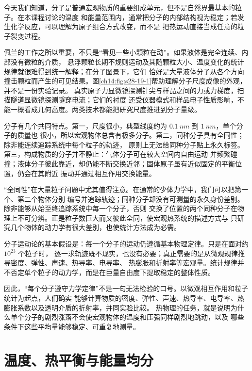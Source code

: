 {\molecularMicroscopyFigure

今天我们知道，分子是普通宏观物质的重要组成单元，但不是自然界最基本的粒子。在本课程讨论的温度
和能量范围内，通常把分子的内部结构视为稳定；若发生化学反应，可以理解为原子组合方式改变，而不是
把热运动直接当成任意的粒子裂变过程。

佩兰的工作之所以重要，不只是“看见一些小颗粒在动”。如果液体是完全连续、内部没有微粒的介质，
悬浮颗粒长期不规则运动及其随颗粒大小、温度变化的统计规律就很难得到统一解释；在分子图景下，它们
恰好是大量液体分子从各个方向撞击颗粒而产生的可见结果。图\ref{ch14:fig:s28-19-1}帮助理解分子尺度成像的外观，并不是一份实验记录。
真实原子力显微镜探测针尖与样品之间的力或力梯度，扫描隧道显微镜探测隧穿电流；它们的衬度
还受仪器模式和样品电子性质影响，不能一概看成几何高度。两类技术都能把研究尺度推进到分子量级。

分子有几个共同特点。第一，尺度很小，典型线度约为 $\SI{0.1}{nm}$ 到 $\SI{1}{nm}$，单个分子的质量也
很小，所以宏观物体总含有极多分子。第二，同种分子具有全同性；除非能连续追踪系统中每个粒子的轨迹，
原则上无法给同种分子贴上永久标签。第三，构成物质的分子并不静止：气体分子可在较大空间内自由运动
并频繁碰撞；液体分子彼此靠近，却仍能不断交换近邻；固体原子虽有近似固定的平衡位置，仍会在其附近
振动并通过相互作用交换能量。

“全同性”在大量粒子问题中尤其值得注意。在通常的少体力学中，我们可以把第一个、第二个物体分别
编号并追踪轨迹；同种分子却没有可测量的永久身份差别。除非能够从始至终追踪系统中每一个分子，否则
交换了位置的两个同种分子在物理上不可分辨。正是粒子数巨大而又彼此全同，使宏观热系统的描述方式与
只研究几个物体的动力学有很大差别，也使统计方法成为必需。

分子运动论的基本假设是：每一个分子的运动仍遵循基本物理定律。只是在面对约 $10^{23}$ 个粒子时，
逐一求轨迹既不现实，也没有必要；真正需要的是从微观规律推导密度、弹性、声速、热导率、电导率、
热膨胀和折射率等宏观量。统计规律并不否定单个粒子的动力学，而是在巨量自由度下提取稳定的整体性质。

因此，“每个分子遵守力学定律”不是一句无法检验的口号。以微观相互作用和粒子统计为起点，人们确实
能够计算物质的密度、弹性、声速、热导率、电导率、热膨胀系数以及透明介质的折射率，并同实验比较。
热物理的任务，就是说明为什么单个分子的剧烈涨落不会使宏观物体的温度和压强同样剧烈地跳动，以及
哪些条件下这些平均量能够稳定、可重复地测量。

\section{温度、热平衡与能量均分}\label{ch14:sec:temperature}

}
